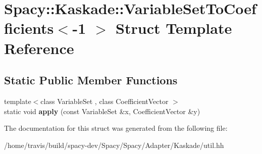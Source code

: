 \hypertarget{structSpacy_1_1Kaskade_1_1VariableSetToCoefficients_3-1_01_4}{\section{Spacy\-:\-:Kaskade\-:\-:Variable\-Set\-To\-Coefficients$<$-\/1 $>$ Struct Template Reference}
\label{structSpacy_1_1Kaskade_1_1VariableSetToCoefficients_3-1_01_4}
}
\subsection*{Static Public Member Functions}
\begin{DoxyCompactItemize}
\item 
\hypertarget{structSpacy_1_1Kaskade_1_1VariableSetToCoefficients_3-1_01_4_a8691dbba4c04d6de55d1192ca85ad808}{{\footnotesize template$<$class Variable\-Set , class Coefficient\-Vector $>$ }\\static void {\bfseries apply} (const Variable\-Set \&x, Coefficient\-Vector \&y)}\label{structSpacy_1_1Kaskade_1_1VariableSetToCoefficients_3-1_01_4_a8691dbba4c04d6de55d1192ca85ad808}

\end{DoxyCompactItemize}


The documentation for this struct was generated from the following file\-:\begin{DoxyCompactItemize}
\item 
/home/travis/build/spacy-\/dev/\-Spacy/\-Spacy/\-Adapter/\-Kaskade/util.\-hh\end{DoxyCompactItemize}

